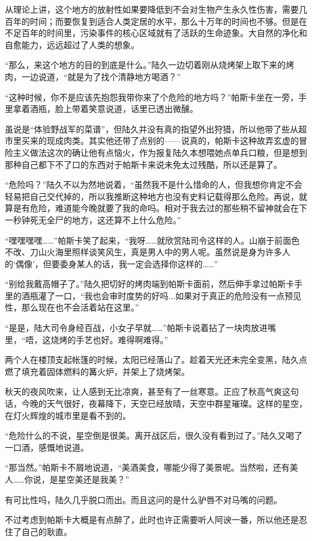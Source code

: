 从理论上讲，这个地方的放射性如果要降低到不会对生物产生永久性伤害，需要几百年的时间；而要恢复到适合人类定居的水平，那么十万年的时间也不够。但是在不足百年的时间里，污染事件的核心区域就有了活跃的生命迹象。大自然的净化和自愈能力，远远超过了人类的想象。

“那么，来这个地方的目的到底是什么。”陆久一边切着刚从烧烤架上取下来的烤肉，一边说道，“就是为了找个清静地方喝酒？”

“这种时候，你不是应该先抱怨我带你来了个危险的地方吗？”帕斯卡坐在一旁，手里拿着酒瓶，脸上带着笑意说道，话里已透出微醺。

虽说是“体验野战军的菜谱”，但陆久并没有真的指望外出狩猎，所以他带了些从超市里买来的现成肉类。其实他还带了点别的——说真的，帕斯卡这种故弄玄虚的冒险主义做法这次的确让他有点恼火，作为报复陆久本想喂她点单兵口粮，但是想到那种自己都下不了口的东西对于帕斯卡来说未免太过残酷，所以还是算了。

“危险吗？”陆久不以为然地说着，“虽然我不是什么惜命的人，但我想你肯定不会轻易把自己交代掉的，所以我推断这种地方也没有史料记载得那么危险。再说，就算是有危险，难道能今晚就要了我的命吗。相对于我去过的那些稍不留神就会在下一秒钟死无全尸的地方，这还算不上什么危险。”

“嘿嘿嘿嘿……”帕斯卡笑了起来，“我呀……就欣赏陆司令这样的人。山崩于前面色不改、刀山火海里照样谈笑风生，真是男人中的男人呢。虽然说是身为许多人的‘偶像’，但要委身某人的话，我一定会选择你这样的……”

“别给我戴高帽子了。”陆久把切好的烤肉端到帕斯卡面前，然后伸手拿过帕斯卡手里的酒瓶灌了一口，“我也会审时度势的好吗...如果对于真正的危险没有一点预见性，那么现在也不会活着站在这里。”

“是是，陆大司令身经百战，小女子早就……”帕斯卡说着拈了一块肉放进嘴里，“唔，这烧烤的手艺也好。难得啊难得。”

两个人在楼顶支起帐篷的时候，太阳已经落山了。趁着天光还未完全变黑，陆久点燃了填充着固体燃料的篝火炉，并架上了烧烤架。

秋天的夜风吹来，让人感到无比凉爽，甚至有了一丝寒意。正应了秋高气爽这句话，今晚的天气很好，夜幕降下，天空已经放晴，天空中群星璀璨。这样的星空，在灯火辉煌的城市里是看不到的。

“危险什么的不说，星空倒是很美。离开战区后，很久没有看到过了。”陆久又喝了一口酒，感慨地说道。

“那当然。”帕斯卡不屑地说道，“美酒美食，哪能少得了美景呢。当然啦，还有美人……你说，是星空美还是我美？”

有可比性吗，陆久几乎脱口而出。而且这问的是什么驴唇不对马嘴的问题。

不过考虑到帕斯卡大概是有点醉了，此时也许正需要听人阿谀一番，所以他还是忍住了自己的耿直。

